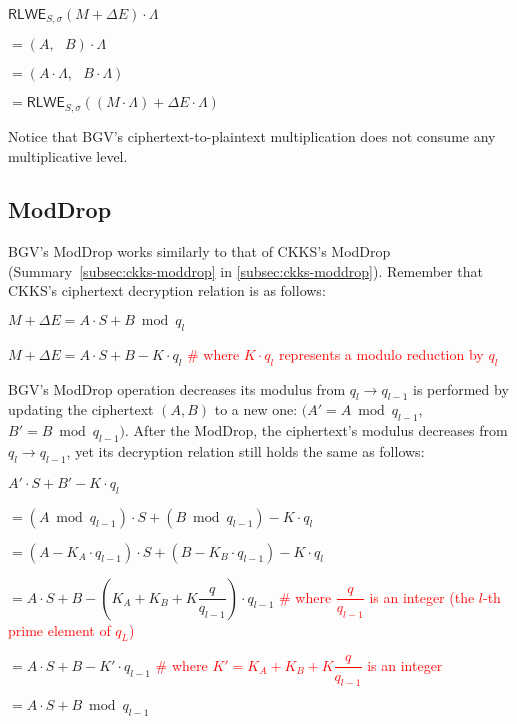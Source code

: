 \begin{tcolorbox}[title={\textbf{\tboxlabel{\ref*{subsec:bgv-mult-plain}} BGV Ciphertext-to-Plaintext Multiplication}}]
$\textsf{RLWE}_{S, \sigma}(M + \Delta E) \cdot \Lambda$

$= (A, \text{ } B) \cdot \Lambda$

$= (A \cdot \Lambda, \text{ }  B \cdot \Lambda )$

$= \textsf{RLWE}_{S, \sigma}((M \cdot \Lambda) + \Delta E\cdot \Lambda )$
\end{tcolorbox}

Notice that BGV's ciphertext-to-plaintext multiplication does not consume any multiplicative level. 

\subsection{\textsf{ModDrop}}
\label{subsec:bgv-moddrop}

BGV's \textsf{ModDrop} works similarly to that of CKKS's \textsf{ModDrop} (Summary~\ref*{subsec:ckks-moddrop} in \autoref{subsec:ckks-moddrop}). Remember that CKKS's ciphertext decryption relation is as follows:

$M + \Delta E = A \cdot S + B \bmod q_l$

$M + \Delta E = A \cdot S + B - K\cdot q_l$ \textcolor{red}{ \# where $K\cdot q_l$ represents a modulo reduction by $q_l$}

BGV's \textsf{ModDrop} operation decreases its modulus from $q_l \rightarrow q_{l-1}$ is performed by updating the ciphertext $(A, B)$ to a new one: $\bm(A' = A \bmod q_{l-1}$, $B' = B \bmod q_{l-1})$. After the \textsf{ModDrop}, the ciphertext's modulus decreases from $q_l \rightarrow q_{l-1}$, yet its decryption relation still holds the same as follows:

$A' \cdot S + B' - K\cdot q_l $

$= (A \bmod q_{l-1}) \cdot S + (B \bmod q_{l-1}) - K\cdot q_l$

$= (A - K_A\cdot q_{l-1}) \cdot S + (B - K_B\cdot q_{l-1}) - K\cdot q_l$ 

$= A\cdot S + B - (K_A + K_B + K\dfrac{q}{q_{l-1}})\cdot q_{l-1}$
\textcolor{red}{ \# where $\dfrac{q}{q_{l-1}}$ is an integer (the $l$-th prime element of $q_L$)}

$= A\cdot S + B - K'\cdot q_{l-1}$ \textcolor{red}{ \# where $K' = K_A + K_B + K\dfrac{q}{q_{l-1}}$ is an integer}

$= A\cdot S + B \bmod q_{l-1}$

